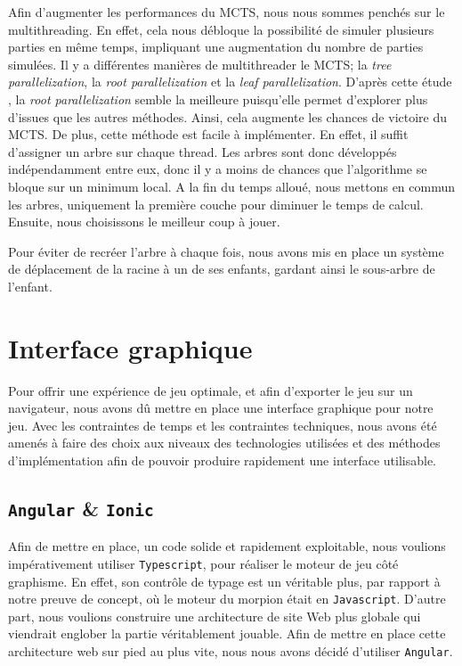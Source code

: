 \documentclass[a4paper,11pt]{article}
\begin{document}
Afin d'augmenter les performances du MCTS, nous nous sommes penchés sur
le multithreading. En effet, cela nous débloque la possibilité de
simuler plusieurs parties en même temps, impliquant une augmentation du
nombre de parties simulées. Il y a différentes manières de multithreader
le MCTS; la \emph{tree parallelization}, la \emph{root parallelization}
et la \emph{leaf parallelization}. D'après cette étude
\citep{mass_par_mcts, par_mcts}, la \emph{root parallelization} semble
la meilleure puisqu'elle permet d'explorer plus d'issues que les autres
méthodes. Ainsi, cela augmente les chances de victoire du MCTS. De plus,
cette méthode est facile à implémenter. En effet, il suffit d'assigner
un arbre sur chaque thread. Les arbres sont donc développés
indépendamment entre eux, donc il y a moins de chances que l'algorithme
se bloque sur un minimum local. A la fin du temps alloué, nous mettons
en commun les arbres, uniquement la première couche pour diminuer le
temps de calcul. Ensuite, nous choisissons le meilleur coup à jouer.

Pour éviter de recréer l'arbre à chaque fois, nous avons mis en place un
système de déplacement de la racine à un de ses enfants, gardant ainsi
le sous-arbre de l'enfant.

\section{Interface graphique}\label{interface-graphique}

Pour offrir une expérience de jeu optimale, et afin d'exporter le jeu
sur un navigateur, nous avons dû mettre en place une interface graphique
pour notre jeu. Avec les contraintes de temps et les contraintes
techniques, nous avons été amenés à faire des choix aux niveaux des
technologies utilisées et des méthodes d'implémentation afin de pouvoir
produire rapidement une interface utilisable.

\subsection{\texorpdfstring{\texttt{Angular} \&
\texttt{Ionic}}{Angular \& Ionic}}\label{angular-ionic}

Afin de mettre en place, un code solide et rapidement exploitable, nous
voulions impérativement utiliser \texttt{Typescript}, pour réaliser le
moteur de jeu côté graphisme. En effet, son contrôle de typage est un
véritable plus, par rapport à notre preuve de concept, où le moteur du
morpion était en \texttt{Javascript}. D'autre part, nous voulions
construire une architecture de site Web plus globale qui viendrait
englober la partie véritablement jouable. Afin de mettre en place cette
architecture web sur pied au plus vite, nous nous avons décidé
d'utiliser \texttt{Angular}.
\end{document}
